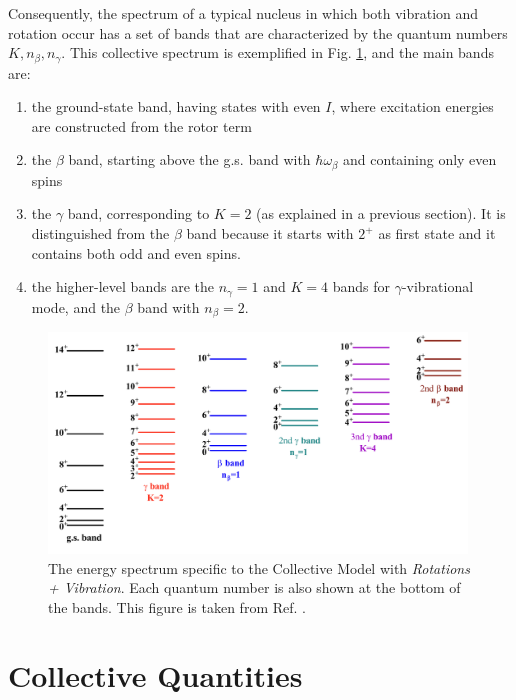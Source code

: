 Consequently, the spectrum of a typical nucleus in which both vibration and rotation occur has a set of bands that are characterized by the quantum numbers $K,n_\beta,n_\gamma$. This collective spectrum is exemplified in Fig. \ref{collective-rotation-vibration-energy-levels}, and the main bands are:
\begin{enumerate}
    \item the ground-state band, having states with even $I$, where excitation energies are constructed from the rotor term
    \item the $\beta$ band, starting above the g.s. band with $\hbar\omega_\beta$ and containing only even spins
    \item the $\gamma$ band, corresponding to $K=2$ (as explained in a previous section). It is distinguished from the $\beta$ band because it starts with $2^+$ as first state and it contains both odd and even spins.
    \item the higher-level bands are the $n_\gamma=1$ and $K=4$ bands for $\gamma$-vibrational mode, and the $\beta$ band with $n_\beta=2$.
\end{enumerate}
\begin{figure}
    \centering
    \includegraphics[width=0.99\textwidth]{Chapters/Figures/types_collective_bands.pdf}
    \caption{The energy spectrum specific to the Collective Model with \emph{Rotations + Vibration}. Each quantum number is also shown at the bottom of the bands. This figure is taken from Ref. \cite{li2022model}.}
    \label{collective-rotation-vibration-energy-levels}
\end{figure}

\section{Collective Quantities}
\label{c3-collective-quantities}

